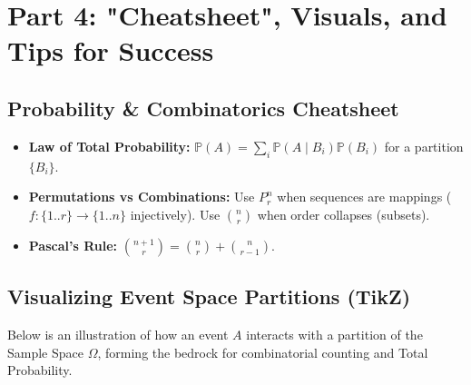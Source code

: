 \documentclass[11pt]{article}
\theoremstyle{definition}
\begin{document}
\section{Part 4: "Cheatsheet", Visuals, and Tips for Success}

\subsection{Probability \& Combinatorics Cheatsheet}
\begin{itemize}
    \item \textbf{Law of Total Probability:} $\mathbb{P}(A) = \sum_{i} \mathbb{P}(A \mid B_i) \mathbb{P}(B_i)$ for a partition $\{B_i\}$.
    \item \textbf{Permutations vs Combinations:} Use $P^n_r$ when sequences are mappings ($f: \{1..r\} \to \{1..n\}$ injectively). Use $\binom{n}{r}$ when order collapses (subsets).
    \item \textbf{Pascal's Rule:} $\binom{n+1}{r} = \binom{n}{r} + \binom{n}{r-1}$.
\end{itemize}

\subsection{Visualizing Event Space Partitions (TikZ)}
Below is an illustration of how an event $A$ interacts with a partition of the Sample Space $\Omega$, forming the bedrock for combinatorial counting and Total Probability.

\begin{center}
\end{center}
\end{document}
